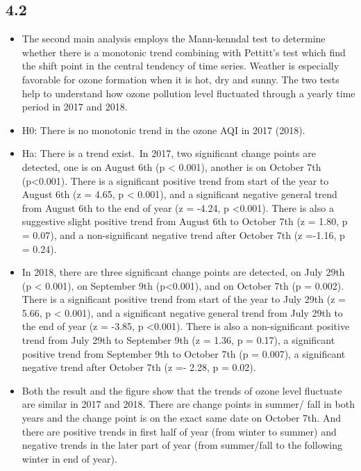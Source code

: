 \documentclass[12pt,]{article}
\begin{document}
\subsection{4.2}\label{section-1}

\begin{itemize}
\item[]The second main analysis employs the Mann-kenndal test to determine whether there is a monotonic trend combining with Pettitt's test which find the shift point in the central tendency of time series. Weather is especially favorable for ozone formation when it is hot, dry and sunny. The two tests help to understand how ozone pollution level fluctuated through a yearly time period in 2017 and 2018.
\item[]H0: There is no monotonic trend in the ozone AQI in 2017 (2018).  \
\item[]Ha: There is a trend exist.\
 In 2017, two significant change points are detected, one is on August 6th (p < 0.001), another is on October 7th (p<0.001). There is a significant positive trend from start of the year to August 6th (z = 4.65, p < 0.001), and a significant negative general trend from August 6th to the end of year (z = -4.24, p <0.001). There is also a suggestive slight positive trend from August 6th to October 7th (z = 1.80, p = 0.07), and a non-significant negative trend after October 7th (z =-1.16, p = 0.24).
\item[]In 2018, there are three significant change points are detected, on July 29th (p < 0.001), on September 9th (p<0.001), and on October 7th (p = 0.002). There is a significant positive trend from start of the year to July 29th (z = 5.66, p < 0.001), and a significant negative general trend from July 29th to the end of year (z = -3.85, p <0.001). There is also a non-significant positive trend from July 29th to September 9th (z = 1.36, p = 0.17), a significant positive trend from September 9th to October 7th (p = 0.007), a significant negative trend after October 7th (z =- 2.28, p = 0.02).
\item[]Both the result and the figure show that the trends of ozone level fluctuate are similar in 2017 and 2018. There are change points in summer/ fall in both years and the change point is on the exact same date on October 7th. And there are positive trends in first half of year (from winter to summer) and negative trends in the later part of year (from summer/fall to the following winter in end of year).
\end{itemize}
\end{document}
